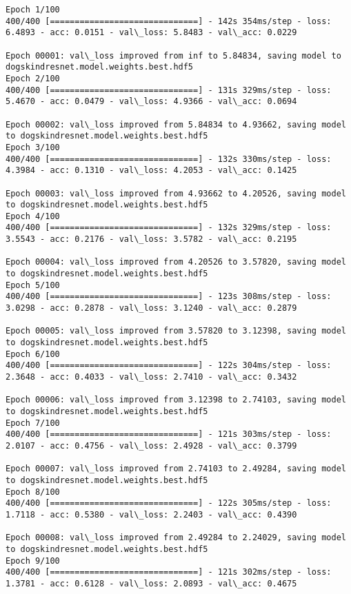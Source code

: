 \documentclass[11pt]{article}
\begin{document}
    \begin{Verbatim}[commandchars=\\\{\}]
Epoch 1/100
400/400 [==============================] - 142s 354ms/step - loss: 6.4893 - acc: 0.0151 - val\_loss: 5.8483 - val\_acc: 0.0229

Epoch 00001: val\_loss improved from inf to 5.84834, saving model to dogskindresnet.model.weights.best.hdf5
Epoch 2/100
400/400 [==============================] - 131s 329ms/step - loss: 5.4670 - acc: 0.0479 - val\_loss: 4.9366 - val\_acc: 0.0694

Epoch 00002: val\_loss improved from 5.84834 to 4.93662, saving model to dogskindresnet.model.weights.best.hdf5
Epoch 3/100
400/400 [==============================] - 132s 330ms/step - loss: 4.3984 - acc: 0.1310 - val\_loss: 4.2053 - val\_acc: 0.1425

Epoch 00003: val\_loss improved from 4.93662 to 4.20526, saving model to dogskindresnet.model.weights.best.hdf5
Epoch 4/100
400/400 [==============================] - 132s 329ms/step - loss: 3.5543 - acc: 0.2176 - val\_loss: 3.5782 - val\_acc: 0.2195

Epoch 00004: val\_loss improved from 4.20526 to 3.57820, saving model to dogskindresnet.model.weights.best.hdf5
Epoch 5/100
400/400 [==============================] - 123s 308ms/step - loss: 3.0298 - acc: 0.2878 - val\_loss: 3.1240 - val\_acc: 0.2879

Epoch 00005: val\_loss improved from 3.57820 to 3.12398, saving model to dogskindresnet.model.weights.best.hdf5
Epoch 6/100
400/400 [==============================] - 122s 304ms/step - loss: 2.3648 - acc: 0.4033 - val\_loss: 2.7410 - val\_acc: 0.3432

Epoch 00006: val\_loss improved from 3.12398 to 2.74103, saving model to dogskindresnet.model.weights.best.hdf5
Epoch 7/100
400/400 [==============================] - 121s 303ms/step - loss: 2.0107 - acc: 0.4756 - val\_loss: 2.4928 - val\_acc: 0.3799

Epoch 00007: val\_loss improved from 2.74103 to 2.49284, saving model to dogskindresnet.model.weights.best.hdf5
Epoch 8/100
400/400 [==============================] - 122s 305ms/step - loss: 1.7118 - acc: 0.5380 - val\_loss: 2.2403 - val\_acc: 0.4390

Epoch 00008: val\_loss improved from 2.49284 to 2.24029, saving model to dogskindresnet.model.weights.best.hdf5
Epoch 9/100
400/400 [==============================] - 121s 302ms/step - loss: 1.3781 - acc: 0.6128 - val\_loss: 2.0893 - val\_acc: 0.4675


\end{Verbatim}
\end{document}
